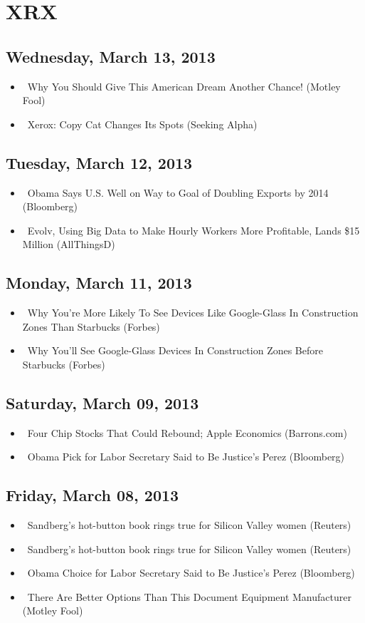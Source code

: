 \documentclass[11pt,asymmetric]{article}
\begin{document}
\section*{XRX}

\subsection*{Wednesday, March 13, 2013}
\begin{itemize}
\item\ Why You Should Give This American Dream Another Chance! (Motley Fool)
\item\ Xerox: Copy Cat Changes Its Spots (Seeking Alpha)
\end{itemize}
\subsection*{Tuesday, March 12, 2013}
\begin{itemize}
\item\ Obama Says U.S. Well on Way to Goal of Doubling Exports by 2014 (Bloomberg)
\item\ Evolv, Using Big Data to Make Hourly Workers More Profitable, Lands \$15 Million (AllThingsD)
\end{itemize}
\subsection*{Monday, March 11, 2013}
\begin{itemize}
\item\ Why You're More Likely To See Devices Like Google-Glass In Construction Zones Than Starbucks (Forbes)
\item\ Why You'll See Google-Glass Devices In Construction Zones Before Starbucks (Forbes)
\end{itemize}
\subsection*{Saturday, March 09, 2013}
\begin{itemize}
\item\ Four Chip Stocks That Could Rebound; Apple Economics (Barrons.com)
\item\ Obama Pick for Labor Secretary Said to Be Justice’s Perez (Bloomberg)
\end{itemize}
\subsection*{Friday, March 08, 2013}
\begin{itemize}
\item\ Sandberg's hot-button book rings true for Silicon Valley women (Reuters)
\item\ Sandberg's hot-button book rings true for Silicon Valley women (Reuters)
\item\ Obama Choice for Labor Secretary Said to Be Justice’s Perez (Bloomberg)
\item\ There Are Better Options Than This Document Equipment Manufacturer (Motley Fool)
\end{itemize}
\end{document}

